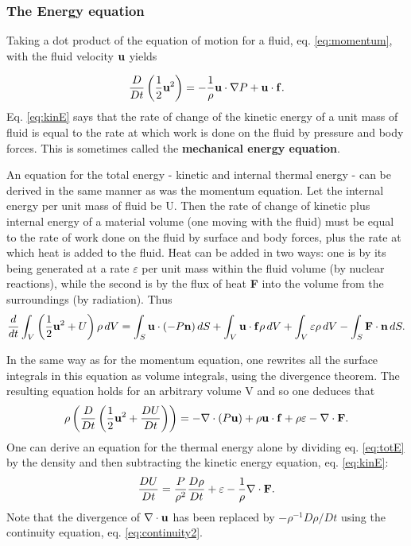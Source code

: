 \bigskip
\subsubsection{The Energy equation}
Taking a dot product of the equation of motion for a fluid, eq. \ref{eq:momentum}, with the fluid
velocity ${\bf u}$ yields

\begin{equation}\label{eq:kinE}
   \frac{D}{Dt}\left( \frac{1}{2} {\bf u}^2 \right) = -\frac{1}{\rho} {\bf u} \cdot \nabla P
      + {\bf u} \cdot {\bf f}.
\end{equation}
Eq. \ref{eq:kinE} says that the rate of change of the kinetic energy of a unit mass of fluid
is equal to the rate at which work is done on the fluid by pressure and body forces. This is 
sometimes called the {\bf mechanical energy equation}.

An equation for the total energy - kinetic and internal thermal energy - can be derived in the same
manner as was the momentum equation. Let the internal energy per unit mass of fluid be U. Then the 
rate of change of kinetic plus internal energy of a material volume (\ie one moving with the fluid) 
must be equal to the rate of work done on the fluid by surface and body forces, plus the rate at
which heat is added to the fluid. Heat can be added in two ways: one is by its being generated at
a rate $\varepsilon$ per unit mass within the fluid volume (\eg by nuclear reactions), while the 
second is by the flux of heat {\bf F} into the volume from the surroundings (\eg by radiation). Thus
\begin{equation}
   \frac{d}{dt}\int_{V}\left( \frac{1}{2} {\bf u}^2 + U \right) \rho \, dV
  = \int_{S}{\bf u} \cdot (-P {\bf n})\, dS + \int_{V} {\bf u} \cdot {\bf f} \rho\,dV
   +\int_{V}\varepsilon\rho\,dV - \int_{S} {\bf F} \cdot {\bf n} \,dS.
\end{equation}

In the same way as for the momentum equation, one rewrites all the surface integrals in this  equation
as volume integrals, using the divergence theorem. The resulting equation holds for an arbitrary 
volume V and so one deduces that
\begin{equation}\label{eq:totE}
  \rho \left( \frac{D}{Dt} \left( \frac{1}{2} {\bf u}^2 + \frac{DU}{Dt} \right) \right)
   = -\nabla \cdot (P {\bf u}) + \rho {\bf u} \cdot {\bf f} + \rho \varepsilon - \nabla \cdot {\bf F}.
\end{equation}
One can derive an equation for the thermal energy alone by dividing eq. \ref{eq:totE} by the 
density and then subtracting the kinetic energy equation, eq. \ref{eq:kinE}:
\begin{equation}\label{eq:thermalE}
  \frac{DU}{Dt} = \frac{P}{\rho^2}\frac{D\rho}{Dt}+\varepsilon-\frac{1}{\rho}\nabla\cdot {\bf F}.
\end{equation}
Note that the divergence of $\nabla \cdot {\bf u}$ has been replaced by $-\rho^{-1} D\rho/Dt$ using the 
continuity equation, eq. \ref{eq:continuity2}.

